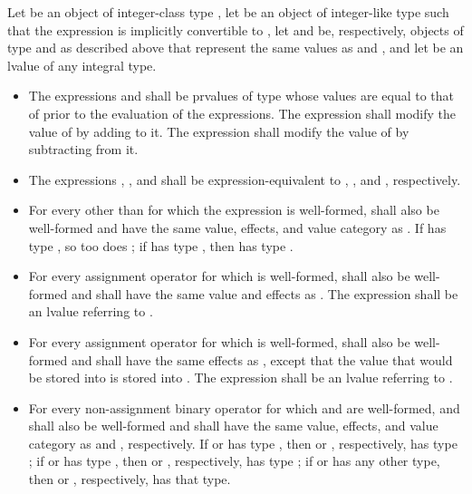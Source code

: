 \pnum
Let  be an object of integer-class type ,
let  be an object of integer-like type 
such that the expression  is implicitly convertible to ,
let  and  be, respectively,
objects of type  and  as described above
that represent the same values as  and , and
let  be an lvalue of any integral type.
\begin{itemize}
\item
The expressions  and  shall be prvalues of type 
whose values are equal to
that of  prior to the evaluation of the expressions.
The expression  shall modify the value of 
by adding  to it.
The expression  shall modify the value of 
by subtracting  from it.
\item
The expressions , , and  shall be
expression-equivalent to
, , and , respectively.
\item
  For every   other than \tcode{\&} for which the expression 
  is well-formed,  shall also be well-formed
  and have the same value, effects, and value category as .
  If  has type , so too does ;
  if  has type , then  has type .
\item
  For every assignment operator 
  for which  is well-formed,
   shall also be well-formed and
  shall have the same value and effects as .
  The expression  shall be an lvalue referring to .
\item
For every assignment operator 
for which  is well-formed,
 shall also be well-formed and
shall have the same effects as ,
except that the value that would be stored into 
is stored into .
The expression  shall be an lvalue referring to .
\item
  For every non-assignment binary operator 
  for which  and  are well-formed,
   and  shall also be well-formed and
  shall have the same value, effects, and value category as
   and , respectively.
  If  or  has type ,
  then  or , respectively, has type ;
  if  or  has type ,
  then  or , respectively, has type ;
  if  or  has any other type,
  then  or , respectively, has that type.
\end{itemize}

